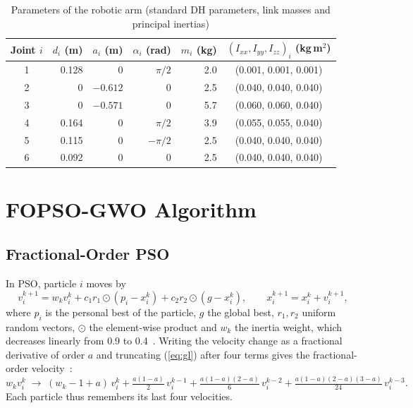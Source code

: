 \documentclass{svproc}
\begin{document}
\begin{table}[!htb]
\caption{Parameters of the robotic arm (standard DH parameters, link masses and principal
inertias)}
\label{tab:arm}
\centering
\begin{tabular}{crrrrc}
\toprule
Joint $i$ & $d_i$ (m) & $a_i$ (m) & $\alpha_i$ (rad) & $m_i$ (kg) & $(I_{xx}, I_{yy}, I_{zz})_i$ (kg\,m$^2$)\\
\midrule
1 & 0.128 & 0      & $\pi/2$  & 2.0 & (0.001, 0.001, 0.001)\\
2 & 0     & $-0.612$ & 0      & 2.5 & (0.040, 0.040, 0.040)\\
3 & 0     & $-0.571$ & 0      & 5.7 & (0.060, 0.060, 0.040)\\
4 & 0.164 & 0      & $\pi/2$  & 3.9 & (0.055, 0.055, 0.040)\\
5 & 0.115 & 0      & $-\pi/2$ & 2.5 & (0.040, 0.040, 0.040)\\
6 & 0.092 & 0      & 0        & 2.5 & (0.040, 0.040, 0.040)\\
\bottomrule
\end{tabular}
\end{table}

\section{FOPSO-GWO Algorithm}

\subsection{Fractional-Order PSO}

In PSO, particle $i$ moves by
\begin{equation}
  v_i^{k+1} = w_k v_i^k + c_1 r_1 \odot (p_i - x_i^k) + c_2 r_2 \odot (g - x_i^k),
  \qquad x_i^{k+1} = x_i^k + v_i^{k+1},
  \label{eq:pso}
\end{equation}
where $p_i$ is the personal best of the particle, $g$ the global best, $r_1, r_2$ uniform
random vectors, $\odot$ the element-wise product and $w_k$ the inertia weight, which
decreases linearly from 0.9 to 0.4~\cite{shi1998}. Writing the velocity change as a
fractional derivative of order $a$ and truncating (\ref{eq:gl}) after four terms gives the
fractional-order velocity~\cite{pires2010}:
\begin{equation}
  w_k v_i^k \;\to\; (w_k - 1 + a)\, v_i^{k} + \tfrac{a(1-a)}{2}\, v_i^{k-1}
  + \tfrac{a(1-a)(2-a)}{6}\, v_i^{k-2} + \tfrac{a(1-a)(2-a)(3-a)}{24}\, v_i^{k-3} .
  \label{eq:fopso}
\end{equation}
Each particle thus remembers its last four velocities.
\end{document}
